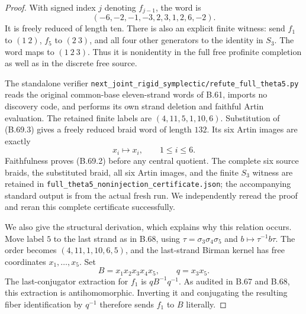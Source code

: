 \begin{proof}
With signed index $j$ denoting $f_{j-1}$, the word is
\[
                 (-6,-2,-1,-3,2,3,1,2,6,-2).
                                                               \tag{B.69.3}
\]
It is freely reduced of length ten.
There is also an explicit finite witness: send
$f_1$ to $(1\ 2)$, $f_5$ to $(2\ 3)$, and all four
other generators to the identity in $S_3$.
The word maps to $(1\ 2\ 3)$.
Thus it is nonidentity in the full free profinite
completion as well as in the discrete free source.

The standalone verifier
\nolinkurl{next_joint_rigid_symplectic/refute_full_theta5.py}
reads the original common-base eleven-strand words of
B.61, imports no discovery code, and performs its own
strand deletion and faithful Artin evaluation.
The retained finite labels are $(4,11,5,1,10,6)$.
Substitution of (B.69.3) gives a freely reduced braid
word of length $132$.  Its six Artin images are exactly
\[
                         x_i\longmapsto x_i,
                         \qquad 1\leq i\leq6.                 \tag{B.69.4}
\]
Faithfulness proves (B.69.2) before any central quotient.
The complete six source braids, the substituted braid,
all six Artin images, and the finite $S_3$ witness are
retained in
\nolinkurl{full_theta5_noninjection_certificate.json};
the accompanying standard output is from the actual
fresh run.  We independently reread the proof and
reran this complete certificate successfully.

We also give the structural derivation, which explains
why this relation occurs.  Move label $5$ to the last
strand as in B.68, using
$\tau=\sigma_3\sigma_4\sigma_5$ and
$b\mapsto\tau^{-1}b\tau$.
The order becomes $(4,11,1,10,6,5)$, and the last-strand
Birman kernel has free coordinates $x_1,\ldots,x_5$.
Set
\[
                       B=x_1x_2x_3x_4x_5,
                       \qquad q=x_3x_5.
                                                               \tag{B.69.5}
\]
The last-conjugator extraction for $f_1$ is
$qB^{-1}q^{-1}$.  As audited in B.67 and B.68, this
extraction is antihomomorphic.  Inverting it and
conjugating the resulting fiber identification by
$q^{-1}$ therefore sends $f_1$ to $B$ literally.


\end{proof}
